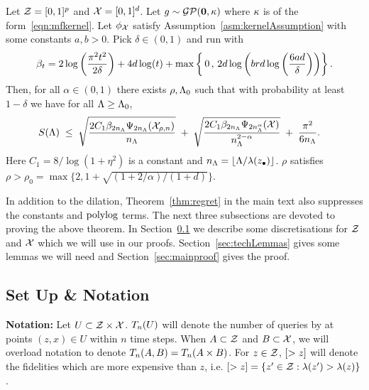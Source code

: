 \begin{theorem}
\label{thm:main}
Let $\mathcal{Z}=[0,1]^p$ and $\mathcal{X}=[0,1]^d$. Let $g\sim\mathcal{G}\mathcal{P}({\bf 0},\kappa)$
where $\kappa$ is of the form~\eqref{eqn:mfkernel}. Let $\phi_{\mathcal{X}}$ satisfy 
Assumption~\ref{asm:kernelAssumption} with some constants $a,b>0$.
Pick $\delta\in(0,1)$ and run \emph{\bocas} with
\[
\beta_t =
2\log\left(\frac{\pi^2t^2}{2\delta}\right) + 4d\log(t) + 
\max\left\{\,0\,,\, 
2d\log\left(brd\log\bigg(\frac{6ad}{\delta}\bigg) \right)\right\}.
\]
Then, for all $\alpha\in(0,1)$ 
there exists $\rho,\Lambda_0$ such that with probability at least $1-\delta$ we have
for all $\Lambda \geq \Lambda_0$,
\begin{align*}
S(\Lambda)\;&\leq\;
  \sqrt{\frac{2C_1\beta_{2n_\Lambda} \Psi_{2n_\Lambda}(\mathcal{X}_{\rho,n})}{n_\Lambda} }
 \;+\;
  \sqrt{\frac{2C_1\beta_{2n_\Lambda} \Psi_{2n_\Lambda^\alpha}(\mathcal{X})}{n_\Lambda^{2-\alpha}} }
  \;+\; \frac{\pi^2}{6n_\Lambda}.
\end{align*}
Here $C_1 = 8/\log(1+\eta^2)$ is a constant and $n_\Lambda=\lfloor \Lambda/\lambda(z_{\bullet}) \rfloor$.
$\rho$ satisfies %
$\rho > \rho_0 = \max\{2, 1 + \sqrt{(1+2/\alpha)/(1+d)}\}$.
\end{theorem}
In addition to the dilation,
Theorem~\ref{thm:regret} in the main text also suppresses the constants and ${\bf{\rm polylog}}$ terms.
The next three subsections are devoted to proving the above theorem.
In Section~\ref{sec:setup} we describe some discretisations for $\mathcal{Z}$ and $\mathcal{X}$ which
we will use in our proofs.
Section~\ref{sec:techLemmas} gives some lemmas we will need and
Section~\ref{sec:mainproof} gives the proof.




\subsection{Set Up \& Notation}
\label{sec:setup}

\textbf{Notation:}
Let $U\subset\mathcal{Z}\times\mathcal{X}$.
$T_n(U)$ will denote the number of queries by \bocas at points $(z,x)\in U$ within
$n$ time steps.
When $A\subset\mathcal{Z}$ and $B\subset\mathcal{X}$, we will overload notation to denote
$T_n(A,B) = T_n(A\times B)$.
For $z\in\mathcal{Z}$, $[>z]$  will denote the fidelities which are more expensive than $z$,
i.e. $[>z] = \{z'\in\mathcal{Z}: \lambda(z') > \lambda(z)\}$.

